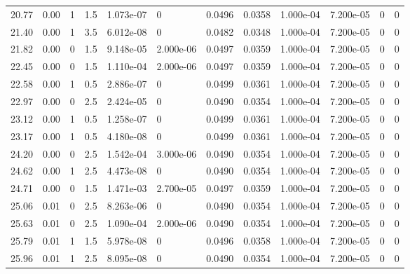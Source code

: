 \documentclass[preview]{standalone}
\begin{document}
{{\begin{tabular}{L{1.2cm}C{1.2cm} C{0.3cm}C{0.5cm} C{1.4cm}C{1.4cm} C{1.4cm}C{1.4cm} C{1.6cm}C{1.6cm} C{1.6cm}C{1.6cm}}
  20.77  &  0.00  & 1     & 1.5 &  1.073e-07  & 0  &  0.0496&   0.0358& 1.000e-04 & 7.200e-05   &  0 & 0  \\ 
  21.40  &  0.00  & 1     & 3.5 &  6.012e-08  & 0  &  0.0482&   0.0348& 1.000e-04 & 7.200e-05   &  0 & 0  \\ 
  21.82  &  0.00  & 0     & 1.5 &  9.148e-05  & 2.000e-06  &  0.0497&   0.0359& 1.000e-04 & 7.200e-05   &  0 & 0  \\ 
  22.45  &  0.00  & 0     & 1.5 &  1.110e-04  & 2.000e-06  &  0.0497&   0.0359& 1.000e-04 & 7.200e-05   &  0 & 0  \\ 
  22.58  &  0.00  & 1     & 0.5 &  2.886e-07  & 0  &  0.0499&   0.0361& 1.000e-04 & 7.200e-05   &  0 & 0  \\ 
  22.97  &  0.00  & 0     & 2.5 &  2.424e-05  & 0  &  0.0490&   0.0354& 1.000e-04 & 7.200e-05   &  0 & 0  \\ 
  23.12  &  0.00  & 1     & 0.5 &  1.258e-07  & 0  &  0.0499&   0.0361& 1.000e-04 & 7.200e-05   &  0 & 0  \\ 
  23.17  &  0.00  & 1     & 0.5 &  4.180e-08  & 0  &  0.0499&   0.0361& 1.000e-04 & 7.200e-05   &  0 & 0  \\ 
  24.20  &  0.00  & 0     & 2.5 &  1.542e-04  & 3.000e-06  &  0.0490&   0.0354& 1.000e-04 & 7.200e-05   &  0 & 0  \\ 
  24.62  &  0.00  & 1     & 2.5 &  4.473e-08  & 0  &  0.0490&   0.0354& 1.000e-04 & 7.200e-05   &  0 & 0  \\ 
  24.71  &  0.00  & 0     & 1.5 &  1.471e-03  & 2.700e-05  &  0.0497&   0.0359& 1.000e-04 & 7.200e-05   &  0 & 0  \\ 
  25.06  &  0.01  & 0     & 2.5 &  8.263e-06  & 0  &  0.0490&   0.0354& 1.000e-04 & 7.200e-05   &  0 & 0  \\ 
  25.63  &  0.01  & 0     & 2.5 &  1.090e-04  & 2.000e-06  &  0.0490&   0.0354& 1.000e-04 & 7.200e-05   &  0 & 0  \\ 
  25.79  &  0.01  & 1     & 1.5 &  5.978e-08  & 0  &  0.0496&   0.0358& 1.000e-04 & 7.200e-05   &  0 & 0  \\ 
  25.96  &  0.01  & 1     & 2.5 &  8.095e-08  & 0  &  0.0490&   0.0354& 1.000e-04 & 7.200e-05   &  0 & 0  \\ 
\hline 
\end{tabular} 

}}
\end{document}
